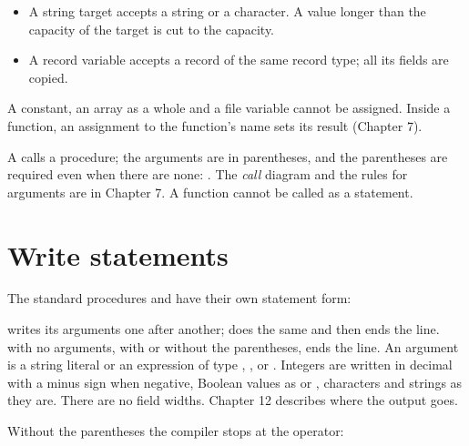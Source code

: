 \begin{itemize}
\item A string target accepts a string or a character.  A value longer than
  the capacity of the target is cut to the capacity.
\item A record variable accepts a record of the same record type; all its
  fields are copied.
\end{itemize}

A constant, an array as a whole and a file variable cannot be assigned.
Inside a function, an assignment to the function's name sets its result
(Chapter 7).



A  calls a procedure; the arguments are in
parentheses, and the parentheses are required even when there are none:
.  The \textit{call} diagram and the rules for arguments are in
Chapter 7.  A function cannot be called as a statement.

\section{Write statements}
The standard procedures  and  have
their own statement form:


 writes its arguments one after another;
 does the same and then ends the line.
 with no arguments, with or without the parentheses, ends the
line.  An argument is a string literal or an expression of type
, ,  or .  Integers are written
in decimal with a minus sign when negative, Boolean values as 
or , characters and strings as they are.  There are no field
widths.  Chapter 12 describes where the output goes.




Without the parentheses the compiler stops at the operator:

